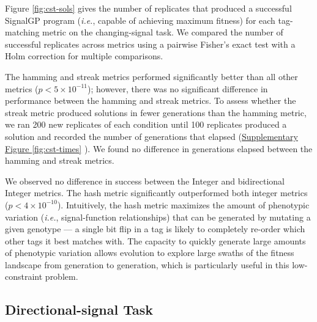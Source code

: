 % 

Figure \ref{fig:cst-sols} gives the number of replicates that produced a successful SignalGP program (\textit{i.e.}, capable of achieving maximum fitness) for each tag-matching metric on the changing-signal task.
We compared the number of successful replicates across metrics using a pairwise Fisher's exact test with a Holm correction for multiple comparisons.

The hamming and streak metrics performed significantly better than all other metrics ($p < 5\times10^{-11}$); however, there was no significant difference in performance between the hamming and streak metrics.
To assess whether the streak metric produced solutions in fewer generations than the hamming metric, we ran 200 new replicates of each condition until 100 replicates produced a solution and recorded the number of generations that elapsed (\href{doi.org/10.17605/OSF.IO/GW5MC}{Supplementary Figure \ref{fig:cst-times}} \citep{Moreno_Ofria_2020}).
We found no difference in generations elapsed between the hamming and streak metrics.

We observed no difference in success between the Integer and bidirectional Integer metrics.
The hash metric significantly outperformed both integer metrics ($p < 4\times10^{-10}$).
Intuitively, the hash metric maximizes the amount of phenotypic variation (\textit{i.e.}, signal-function relationships) that can be generated by mutating a given genotype --- a single bit flip in a tag is likely to completely re-order which other tags it best matches with.
The capacity to quickly generate large amounts of phenotypic variation allows evolution to explore large swaths of the fitness landscape from generation to generation, which is particularly useful in this low-constraint problem.

\subsection{Directional-signal Task}



